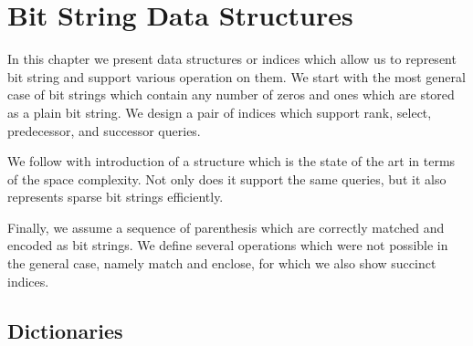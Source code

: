 \chapter{Bit String Data Structures}\label{c:bit-strings}

In this chapter we present data structures or indices which allow us to represent bit string and support various operation on them.
We start with the most general case of bit strings which contain any number of zeros and ones which are stored as a plain bit string.
We design a pair of indices which support rank, select, predecessor, and successor queries.

We follow with introduction of a structure which is the state of the art in terms of the space complexity.
Not only does it support the same queries, but it also represents sparse bit strings efficiently.

Finally, we assume a sequence of parenthesis which are correctly matched and encoded as bit strings.
We define several operations which were not possible in the general case, namely match and enclose, for which we also show succinct indices.

\section{Dictionaries}



